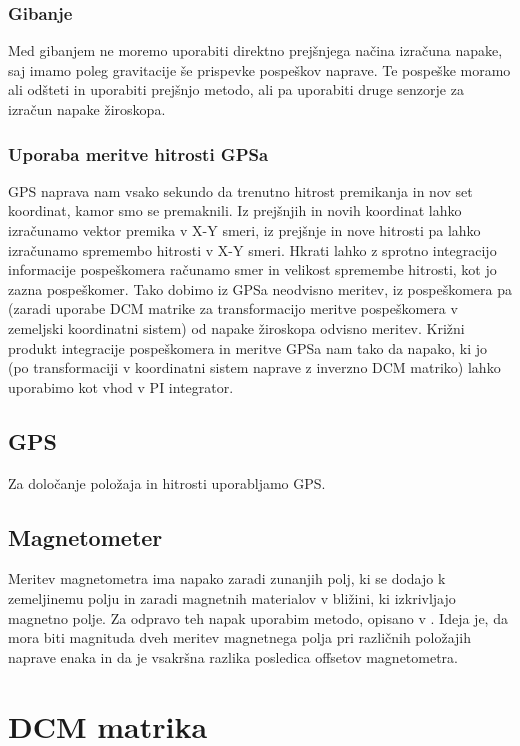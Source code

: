 \documentclass[]{article}
\begin{document}
\subsubsection{Gibanje}
Med gibanjem ne moremo uporabiti direktno prejšnjega načina izračuna napake, saj imamo poleg gravitacije še prispevke pospeškov naprave. Te pospeške moramo ali odšteti in uporabiti prejšnjo metodo, ali pa uporabiti druge senzorje za izračun napake žiroskopa.
\subsubsection{Uporaba meritve hitrosti GPSa}
GPS naprava nam vsako sekundo da trenutno hitrost premikanja in nov set koordinat, kamor smo se premaknili. Iz prejšnjih in novih koordinat lahko izračunamo vektor premika v X-Y smeri, iz prejšnje in nove hitrosti pa lahko izračunamo spremembo hitrosti v X-Y smeri. 
Hkrati lahko z sprotno integracijo informacije pospeškomera računamo smer in velikost spremembe hitrosti, kot jo zazna pospeškomer. Tako dobimo iz GPSa neodvisno meritev, iz pospeškomera pa (zaradi uporabe DCM matrike za transformacijo meritve pospeškomera v zemeljski koordinatni sistem) od napake žiroskopa odvisno meritev. Križni produkt integracije pospeškomera in meritve GPSa nam tako da napako, ki jo (po transformaciji v koordinatni sistem naprave z inverzno DCM matriko) lahko uporabimo kot vhod v PI integrator.

\subsection{GPS}
Za določanje položaja in hitrosti uporabljamo GPS.

\subsection{Magnetometer}
Meritev magnetometra ima napako zaradi zunanjih polj, ki se dodajo k zemeljinemu polju in zaradi magnetnih materialov v bližini, ki izkrivljajo magnetno polje.
Za odpravo teh napak uporabim metodo, opisano v \cite{Magnetometer Offset Cancellation: Theory and Implementation, revisited}.
Ideja je, da mora biti magnituda dveh meritev magnetnega polja pri različnih položajih naprave enaka in da je vsakršna razlika posledica offsetov magnetometra.

\clearpage

\section{DCM matrika}
\end{document}
